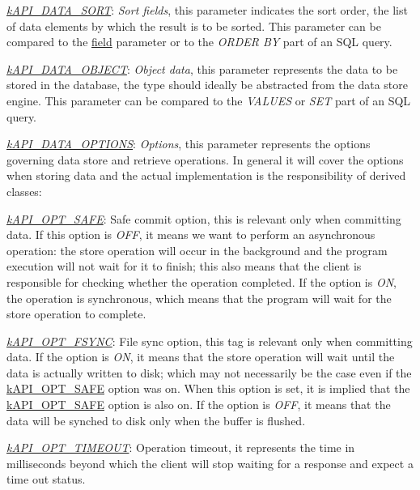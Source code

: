 \begin{DoxyItemize}
\begin{DoxyItemize}
\item {\itshape \hyperlink{}{k\-A\-P\-I\-\_\-\-D\-A\-T\-A\-\_\-\-S\-O\-R\-T}\/}\-: {\itshape Sort fields\/}, this parameter indicates the sort order, the list of data elements by which the result is to be sorted. This parameter can be compared to the \hyperlink{}{field} parameter or to the {\itshape O\-R\-D\-E\-R B\-Y\/} part of an S\-Q\-L query. 
\item {\itshape \hyperlink{}{k\-A\-P\-I\-\_\-\-D\-A\-T\-A\-\_\-\-O\-B\-J\-E\-C\-T}\/}\-: {\itshape Object data\/}, this parameter represents the data to be stored in the database, the type should ideally be abstracted from the data store engine. This parameter can be compared to the {\itshape V\-A\-L\-U\-E\-S\/} or {\itshape S\-E\-T\/} part of an S\-Q\-L query. 
\item {\itshape \hyperlink{}{k\-A\-P\-I\-\_\-\-D\-A\-T\-A\-\_\-\-O\-P\-T\-I\-O\-N\-S}\/}\-: {\itshape Options\/}, this parameter represents the options governing data store and retrieve operations. In general it will cover the options when storing data and the actual implementation is the responsibility of derived classes\-: 
\begin{DoxyItemize}
\item {\itshape \hyperlink{}{k\-A\-P\-I\-\_\-\-O\-P\-T\-\_\-\-S\-A\-F\-E}\/}\-: Safe commit option, this is relevant only when committing data. If this option is {\itshape O\-F\-F\/}, it means we want to perform an asynchronous operation\-: the store operation will occur in the background and the program execution will not wait for it to finish; this also means that the client is responsible for checking whether the operation completed. If the option is {\itshape O\-N\/}, the operation is synchronous, which means that the program will wait for the store operation to complete. 
\item {\itshape \hyperlink{}{k\-A\-P\-I\-\_\-\-O\-P\-T\-\_\-\-F\-S\-Y\-N\-C}\/}\-: File sync option, this tag is relevant only when committing data. If the option is {\itshape O\-N\/}, it means that the store operation will wait until the data is actually written to disk; which may not necessarily be the case even if the \hyperlink{}{k\-A\-P\-I\-\_\-\-O\-P\-T\-\_\-\-S\-A\-F\-E} option was on. When this option is set, it is implied that the \hyperlink{}{k\-A\-P\-I\-\_\-\-O\-P\-T\-\_\-\-S\-A\-F\-E} option is also on. If the option is {\itshape O\-F\-F\/}, it means that the data will be synched to disk only when the buffer is flushed. 
\item {\itshape \hyperlink{}{k\-A\-P\-I\-\_\-\-O\-P\-T\-\_\-\-T\-I\-M\-E\-O\-U\-T}\/}\-: Operation timeout, it represents the time in milliseconds beyond which the client will stop waiting for a response and expect a time out status. 

\end{DoxyItemize}
\end{DoxyItemize}
\end{DoxyItemize}
